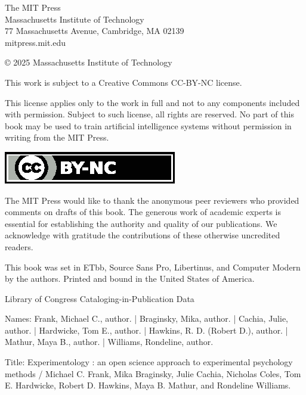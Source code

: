 \begin{titlepage}
  \vspace*{\fill}
  {\rmfamily\scriptsize
    The MIT Press\\
    Massachusetts Institute of Technology\\
    77 Massachusetts Avenue, Cambridge, MA 02139\\
    mitpress.mit.edu\par
    \vspace{2ex}
    © 2025 Massachusetts Institute of Technology\par
    This work is subject to a Creative Commons CC-BY-NC license.\par
    This license applies only to the work in full and not to any components included with permission. Subject to such license, all rights are reserved. No part of this book may be used to train artificial intelligence systems without permission in writing from the MIT Press.\par
    \includegraphics{resources/tex/by-nc[48]}\par
    The MIT Press would like to thank the anonymous peer reviewers who provided comments on drafts of this book. The generous work of academic experts is essential for establishing the authority and quality of our publications. We acknowledge with gratitude the contributions of these otherwise uncredited readers.\par
    This book was set in ETbb, Source Sans Pro, Libertinus, and Computer Modern by the authors. Printed and bound in the United States of America.

  \begin{tcolorbox}[size=minimal, boxrule=0pt, width=0.6\linewidth]
    {\scriptsize
    \raggedright
    \leftskip 0.15in
    \parindent -0.15in
    Library of Congress Cataloging-in-Publication Data
    
    Names: Frank, Michael C., author. | Braginsky, Mika, author. | Cachia,
       Julie, author. | Hardwicke, Tom E., author. | Hawkins, R. D. (Robert
       D.), author. | Mathur, Maya B., author. | Williams, Rondeline, author. 
    \parskip 0in

    Title: Experimentology : an open science approach to experimental
       psychology methods / Michael C. Frank, Mika Braginsky, Julie Cachia,
       Nicholas Coles, Tom E. Hardwicke, Robert D. Hawkins, Maya B. Mathur, and
       Rondeline Williams. 
    
}
\end{tcolorbox}}
\end{titlepage}
